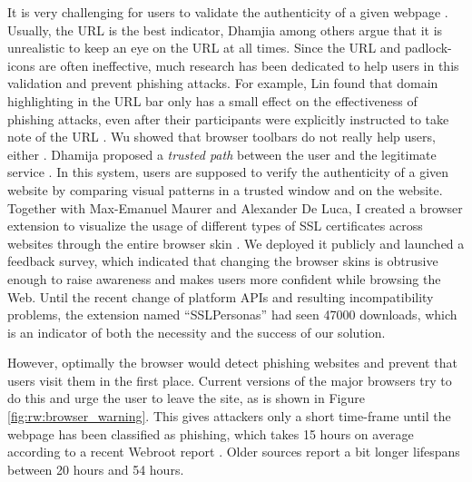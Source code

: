 It is very challenging for users to validate the authenticity of a given webpage \cite{Dhamija2006WhyPhishingWorks, Fogg2001WhatMakesSitesCredible}. Usually, the URL is the best indicator, Dhamjia \etal among others argue that it is unrealistic to keep an eye on the URL at all times. Since the URL and padlock-icons are often ineffective, much research has been dedicated to help users in this validation and prevent phishing attacks. For example, Lin \etal found that domain highlighting in the URL bar only has a small effect on the effectiveness of phishing attacks, even after their participants were explicitly instructed to take note of the URL \cite{Lin2011DomainHighlighting}. Wu \etal showed that browser toolbars do not really help users, either \cite{Wu2006SecurityToolbars}. Dhamija \etal proposed a \textit{trusted path} between the user and the legitimate service \cite{Dhamija2005DynamicSecuritySkins}. In this system, users are supposed to verify the authenticity of a given website by comparing visual patterns in a trusted window and on the website. Together with Max-Emanuel Maurer and Alexander De Luca, I created a browser extension to visualize the usage of different types of SSL certificates across websites through the entire browser skin \cite{Maurer2011ShiningChrome}. We deployed it publicly and launched a feedback survey, which indicated that changing the browser skins is obtrusive enough to raise awareness and makes users more confident while browsing the Web. Until the recent change of platform APIs and resulting incompatibility problems, the extension named ``SSLPersonas'' had seen 47000 downloads, which is an indicator of both the necessity and the success of our solution. 

However, optimally the browser would detect phishing websites and prevent that users visit them in the first place. Current versions of the major browsers try to do this and urge the user to leave the site, as is shown in Figure \ref{fig:rw:browser_warning}. This gives attackers only a short time-frame until the webpage has been classified as phishing, which takes 15 hours on average according to a recent Webroot report \cite{Girtakovskis2017WebrootThreatReport}. Older sources report a bit longer lifespans between 20 hours and 54 hours. 

